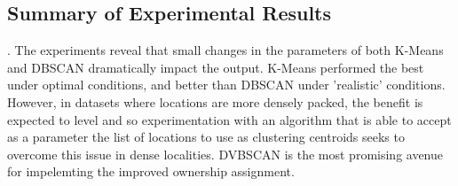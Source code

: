 \subsection{Summary of Experimental Results}. 
The experiments reveal that small changes in the parameters of both K-Means and DBSCAN dramatically impact the output. K-Means performed the best under optimal conditions, and better than DBSCAN under 'realistic' conditions. 
However, in datasets where locations are more densely packed, the benefit is expected to level and so experimentation with an algorithm that is able to accept as a parameter the list of locations to use as clustering centroids seeks to overcome this issue in dense localities. 
DVBSCAN is the most promising avenue for impelemting the improved ownership assignment. 
